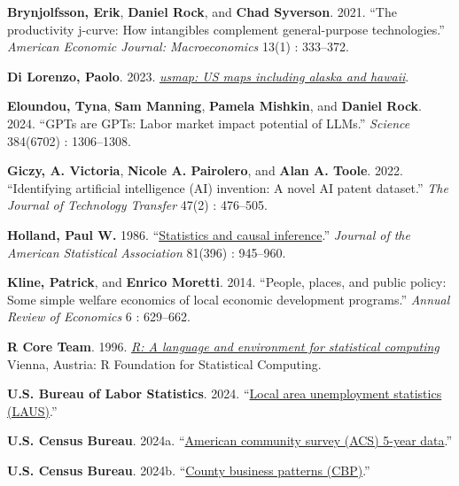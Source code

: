 \documentclass[
]{article}
\newlength{\cslhangindent}
\newenvironment{CSLReferences}[2] %
 {\begin{list}{}{%
  \setlength{\itemindent}{0pt}
  \setlength{\leftmargin}{0pt}
  \setlength{\parsep}{0pt}
  \ifodd #1
   \setlength{\leftmargin}{\cslhangindent}
   \setlength{\itemindent}{-1\cslhangindent}
  \fi
  \setlength{\itemsep}{#2\baselineskip}}}
 {\end{list}}
\begin{document}
\begin{CSLReferences}{1}{0}
\textbf{Brynjolfsson, Erik}, \textbf{Daniel Rock}, and \textbf{Chad
Syverson}. 2021. {``The productivity j-curve: How intangibles complement
general-purpose technologies.''} \emph{American Economic Journal:
Macroeconomics} 13(1) : 333--372.

\textbf{Di Lorenzo, Paolo}. 2023.
\emph{\href{https://CRAN.R-project.org/package=usmap}{{usmap}: US maps
including alaska and hawaii}}.

\textbf{Eloundou, Tyna}, \textbf{Sam Manning}, \textbf{Pamela Mishkin},
and \textbf{Daniel Rock}. 2024. {``GPTs are GPTs: Labor market impact
potential of LLMs.''} \emph{Science} 384(6702) : 1306--1308.

\textbf{Giczy, A. Victoria}, \textbf{Nicole A. Pairolero}, and
\textbf{Alan A. Toole}. 2022. {``Identifying artificial intelligence
(AI) invention: A novel AI patent dataset.''} \emph{The Journal of
Technology Transfer} 47(2) : 476--505.

\textbf{Holland, Paul W.} 1986.
{``\href{https://doi.org/10.1080/01621459.1986.10478354}{Statistics and
causal inference}.''} \emph{Journal of the American Statistical
Association} 81(396) : 945--960.

\textbf{Kline, Patrick}, and \textbf{Enrico Moretti}. 2014. {``People,
places, and public policy: Some simple welfare economics of local
economic development programs.''} \emph{Annual Review of Economics} 6 :
629--662.

\textbf{R Core Team}. 1996. \emph{\href{https://www.R-project.org/}{R: A
language and environment for statistical computing}} Vienna, Austria: R
Foundation for Statistical Computing.

\textbf{U.S. Bureau of Labor Statistics}. 2024.
{``\href{https://www.bls.gov/lau/}{Local area unemployment statistics
(LAUS)}.''}

\textbf{U.S. Census Bureau}. 2024a.
{``\href{https://www.census.gov/data/datasets/time-series/econ/acs/acs-datasets.html}{American
community survey (ACS) 5-year data}.''}

\textbf{U.S. Census Bureau}. 2024b.
{``\href{https://www.census.gov/programs-surveys/cbp/data/datasets.html}{County
business patterns (CBP)}.''}


\end{CSLReferences}
\end{document}
